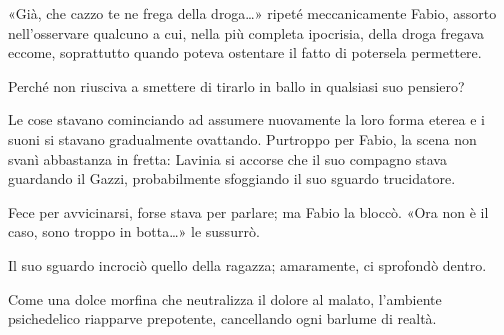 «Già, che cazzo te ne frega della droga\ldots{}» ripeté meccanicamente Fabio, assorto nell'osservare qualcuno a cui, nella più completa ipocrisia, della droga fregava eccome, soprattutto quando poteva ostentare il fatto di potersela permettere.

Perché non riusciva a smettere di tirarlo in ballo in qualsiasi suo pensiero?

Le cose stavano cominciando ad assumere nuovamente la loro forma eterea e i suoni si stavano gradualmente ovattando. Purtroppo per Fabio, la scena non svanì abbastanza in fretta: Lavinia si accorse che il suo compagno stava guardando il Gazzi, probabilmente sfoggiando il suo sguardo trucidatore.

Fece per avvicinarsi, forse stava per parlare; ma Fabio la bloccò. «Ora non è il caso, sono troppo in botta\ldots{}» le sussurrò.

Il suo sguardo incrociò quello della ragazza; amaramente, ci sprofondò dentro.

Come una dolce morfina che neutralizza il dolore al malato, l'ambiente psichedelico riapparve prepotente, cancellando ogni barlume di realtà.